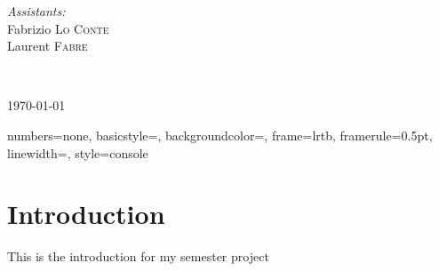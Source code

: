 \begin{titlepage}
\begin{center}
\begin{minipage}{0.4\textwidth}
\begin{flushright}
        \emph{Assistants:} \\
        Fabrizio \textsc{Lo Conte}\\
        Laurent \textsc{Fabre}\\[0.5cm]
      \end{flushright}
    \end{minipage} \\[2cm]
     
    \vfill
     
    {\large \today}
     
  \end{center}

\end{titlepage}

\newpage{}

\fancyfoot{}
\lhead{}
\cfoot{\thepage}        %
\rfoot{\today} %



\tableofcontents{}

\newpage

\lstset{language=C}



{
  numbers=none,
  basicstyle=\ttfamily\footnotesize,
  backgroundcolor=\color{grey97},
  frame=lrtb,
  framerule=0.5pt,
  linewidth=\textwidth,
}
{
  style=console
}

\lstset{
  style=console
}



\section*{Introduction}
This is the introduction for my semester project

